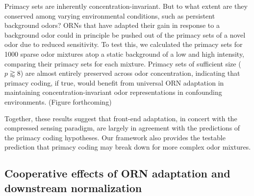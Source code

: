 Primacy sets are inherently concentration-invariant. But to what extent are they conserved among varying environmental conditions, such as persistent background odors? ORNs that have adapted their gain in response to a background odor could in principle be pushed out of the primacy sets of a novel odor due to reduced sensitivity. To test this, we calculated the primacy sets for 1000  sparse odor mixtures atop a static background of a low and high intensity, comparing their primacy sets for each mixture. Primacy sets of sufficient size ($p \gtrapprox 8$) are almost entirely preserved across odor concentration, indicating that primacy coding, if true, would benefit from universal ORN  adaptation in maintaining concentration-invariant odor representations in confounding environments. (Figure forthcoming)


Together, these results suggest that front-end adaptation, in concert with the compressed sensing paradigm, are largely in agreement with the predictions of the primacy coding hypotheses. Our framework also provides the testable prediction that primacy coding may break down for more complex odor mixtures.

\subsection{Cooperative effects of ORN adaptation and  downstream normalization}


